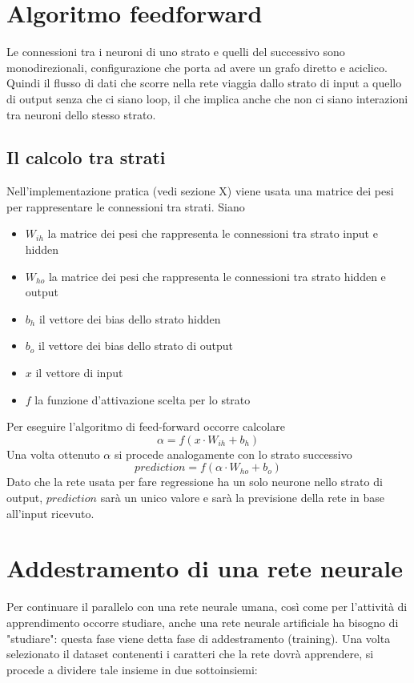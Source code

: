 \documentclass[12pt]{report}
\begin{document}
\section{Algoritmo feedforward}
Le connessioni tra i neuroni di uno strato e quelli del successivo sono monodirezionali, configurazione che porta ad avere un grafo diretto e aciclico. Quindi il flusso di dati che scorre nella rete viaggia dallo strato di input a quello di output senza che ci siano loop, il che implica anche che non ci siano interazioni tra neuroni dello stesso strato.

\subsection{Il calcolo tra strati}
Nell'implementazione pratica (vedi sezione X) viene usata una matrice dei pesi per rappresentare le connessioni tra strati. 
Siano 
\begin{itemize}
\item{$W_{ih}$} la matrice dei pesi che rappresenta le connessioni tra strato input e hidden
\item{$W_{ho}$} la matrice dei pesi che rappresenta le connessioni tra strato hidden e output
\item{$b_h$} il vettore dei bias dello strato hidden
\item{$b_o$} il vettore dei bias dello strato di output
\item{$x$} il vettore di input
\item{$f$} la funzione d'attivazione scelta per lo strato
\end{itemize}
Per eseguire l'algoritmo di feed-forward occorre calcolare
$$\alpha = f\left(x \cdot W_{ih} + b_h\right)$$
Una volta ottenuto $\alpha$ si procede analogamente con lo strato successivo
$$prediction = f\left(\alpha \cdot W_{ho} + b_o\right)$$
Dato che la rete usata per fare regressione ha un solo neurone nello strato di output, $prediction$ sarà un unico valore e sarà la previsione della rete in base all'input ricevuto.

\section{Addestramento di una rete neurale}
Per continuare il parallelo con una rete neurale umana, così come per l'attività di apprendimento occorre studiare, anche una rete neurale artificiale ha bisogno di "studiare": questa fase viene detta fase di addestramento (training).
Una volta selezionato il dataset contenenti i caratteri che la rete dovrà apprendere, si procede a dividere tale insieme in due sottoinsiemi:
\end{document}
